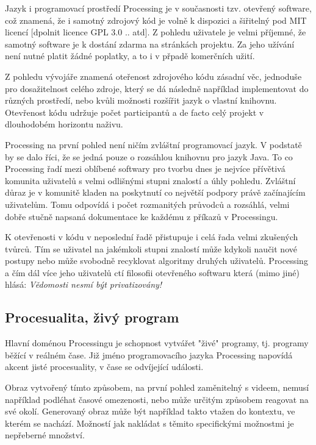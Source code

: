 \documentclass[11pt]{article} %
\begin{document}
Jazyk i programovací prostředí Processing je v současnosti tzv. otevřený software, což znamená, že i samotný zdrojový kód je volně k dispozici a šiřitelný pod MIT licencí [dpolnit licence GPL 3.0 .. atd]. Z pohledu uživatele je velmi příjemné, že samotný software je k dostání zdarma na stránkách projektu. Za jeho užívání není nutné platit žádné poplatky, a to i v přpadě komerčních užití.

Z pohledu vývojáře znamená oteřenost zdrojového kódu zásadní věc, jednoduše pro dosažitelnost celého zdroje, který se dá následně například implementovat do různých prostředí, nebo kvůli možnosti rozšířit jazyk o vlastní knihovnu. Otevřenost kódu udržuje počet participantů a de facto celý projekt v dlouhodobém horizontu naživu.

Processing na první pohled není ničím zvláštní programovací jazyk. V podstatě by se dalo říci, že se jedná pouze o rozsáhlou knihovnu pro jazyk Java. To co Processing řadí mezi oblíbené softwary pro tvorbu dnes je nejvíce přívětivá komunita uživatelů s velmi odlišnými stupni znalostí a úhly pohledu. Zvláštní důraz je v komunitě kladen na poskytnutí co největší podpory právě začínajícím uživatelům. Tomu odpovídá i počet rozmanitých průvodců a rozsáhlá, velmi dobře stučně napsaná dokumentace ke každému z příkazů v Processingu.

K otevřenosti v kódu v neposlední řadě přistupuje i celá řada velmi zkušených tvůrců. Tím se uživatel na jakémkoli stupni znalostí může kdykoli naučit nové postupy nebo může svobodně recyklovat algoritmy druhých uživatelů. Processing a čím dál více jeho uživatelů ctí filosofii otevřeného softwaru která (mimo jiné) hlásá: {\em Vědomosti nesmí být privatizovány!}

\subsection{Procesualita, živý program}

Hlavní doménou Processingu je schopnost vytvářet "živé" programy, tj. programy běžící v reálném čase. Již jméno programovacího jazyka Processing napovídá akcent jisté procesuality, v čase se odvíjející události.

Obraz vytvořený tímto způsobem, na první pohled zaměnitelný s videem, nemusí například podléhat časové omezenosti, nebo může určitým způsobem reagovat na své okolí. Generovaný obraz může být například takto vtažen do kontextu, ve kterém se nachází. Možností jak nakládat s těmito specifickými možnostmi je nepřeberné množství.
\end{document}
